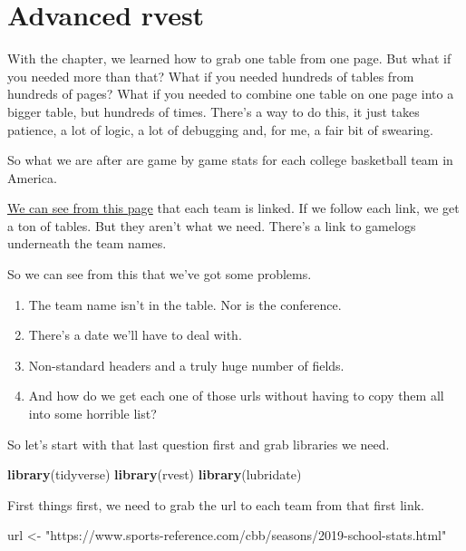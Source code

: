\documentclass[]{book}
\newenvironment{Shaded}{\begin{snugshade}}{\end{snugshade}}
\newcommand{\KeywordTok}[1]{\textcolor[rgb]{0.13,0.29,0.53}{\textbf{#1}}}
\newcommand{\NormalTok}[1]{#1}
\newcommand{\StringTok}[1]{\textcolor[rgb]{0.31,0.60,0.02}{#1}}
\providecommand{\tightlist}{%
  \setlength{\itemsep}{0pt}\setlength{\parskip}{0pt}}
\begin{document}
\hypertarget{advanced-rvest}{%
\chapter{Advanced rvest}\label{advanced-rvest}}

With the chapter, we learned how to grab one table from one page. But what if you needed more than that? What if you needed hundreds of tables from hundreds of pages? What if you needed to combine one table on one page into a bigger table, but hundreds of times. There's a way to do this, it just takes patience, a lot of logic, a lot of debugging and, for me, a fair bit of swearing.

So what we are after are game by game stats for each college basketball team in America.

\href{https://www.sports-reference.com/cbb/seasons/2019-school-stats.html}{We can see from this page} that each team is linked. If we follow each link, we get a ton of tables. But they aren't what we need. There's a link to gamelogs underneath the team names.

So we can see from this that we've got some problems.

\begin{enumerate}
\def\labelenumi{\arabic{enumi}.}
\tightlist
\item
  The team name isn't in the table. Nor is the conference.
\item
  There's a date we'll have to deal with.
\item
  Non-standard headers and a truly huge number of fields.
\item
  And how do we get each one of those urls without having to copy them all into some horrible list?
\end{enumerate}

So let's start with that last question first and grab libraries we need.

\begin{Shaded}
\begin{Highlighting}[]
\KeywordTok{library}\NormalTok{(tidyverse)}
\KeywordTok{library}\NormalTok{(rvest)}
\KeywordTok{library}\NormalTok{(lubridate)}
\end{Highlighting}
\end{Shaded}

First things first, we need to grab the url to each team from that first link.

\begin{Shaded}
\begin{Highlighting}[]
\NormalTok{url <-}\StringTok{ "https://www.sports-reference.com/cbb/seasons/2019-school-stats.html"}
\end{Highlighting}
\end{Shaded}
\end{document}
